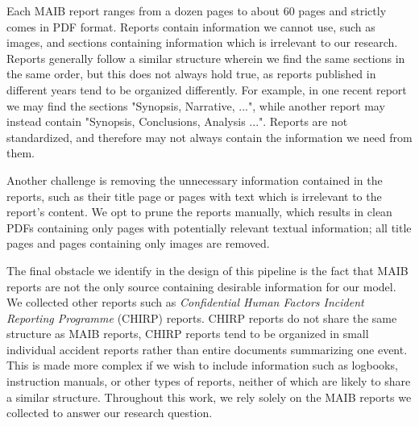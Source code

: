 \documentclass[10pt]{reportMaster}
\begin{document}
Each MAIB report ranges from a dozen pages to about 60 pages and strictly comes in PDF format. Reports contain information we cannot use, such as images, and sections containing information which is irrelevant to our research. Reports generally follow a similar structure wherein we find the same sections in the same order, but this does not always hold true, as reports published in different years tend to be organized differently. For example, in one recent report we may find the sections "Synopsis, Narrative, ...", while another report may instead contain "Synopsis, Conclusions, Analysis ...". Reports are not standardized, and therefore may not always contain the information we need from them.

Another challenge is removing the unnecessary information contained in the reports, such as their title page or pages with text which is irrelevant to the report's content. We opt to prune the reports manually, which results in clean PDFs containing only pages with potentially relevant textual information; all title pages and pages containing only images are removed. 

The final obstacle we identify in the design of this pipeline is the fact that MAIB reports are not the only source containing desirable information for our model. We collected other reports such as \textit{Confidential Human Factors
Incident Reporting Programme} (CHIRP) reports\cite{CHIRP}. CHIRP reports do not share the same structure as MAIB reports, CHIRP reports tend to be organized in small individual accident reports rather than entire documents summarizing one event. This is made more complex if we wish to include information such as logbooks, instruction manuals, or other types of reports, neither of which are likely to share a similar structure. Throughout this work, we rely solely on the MAIB reports we collected to answer our research question.


\end{document}
